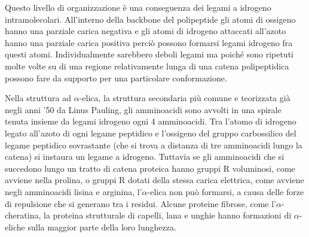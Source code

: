 {{Questo livello di organizzazione è una conseguenza dei legami a idrogeno intramolecolari. All'interno della backbone del polipeptide gli atomi di ossigeno hanno una parziale carica negativa e gli atomi di idrogeno attaccati all'azoto hanno una parziale carica positiva perciò possono formarsi legami idrogeno fra questi atomi. Individualmente sarebbero deboli legami ma poiché sono ripetuti molte volte su di una regione relativamente lunga di una catena polipeptidica possono fare da supporto per una particolare conformazione.

\par Nella struttura ad $\alpha$-elica, la struttura secondaria più comune e teorizzata già negli anni '50 da Linus Pauling, gli amminoacidi sono avvolti in una spirale tenuta insieme da legami idrogeno ogni 4 amminoacidi. Tra l’atomo di idrogeno legato all’azoto di ogni legame peptidico e l’ossigeno del gruppo carbossilico del legame peptidico sovrastante (che si trova a distanza di tre amminoacidi lungo la catena) si instaura un legame a idrogeno. Tuttavia se gli amminoacidi che si succedono lungo un tratto di catena proteica hanno gruppi R voluminosi, come avviene nella prolina, o gruppi R dotati della stessa carica elettrica, come avviene negli amminoacidi lisina e arginina, l’$\alpha$-elica non può formarsi, a causa delle forze di repulsione che si generano tra i residui. Alcune proteine fibrose, come l'$\alpha$-cheratina, la proteina strutturale di capelli, lana e unghie hanno formazioni di $\alpha$-eliche sulla maggior parte della loro lunghezza.

}}
